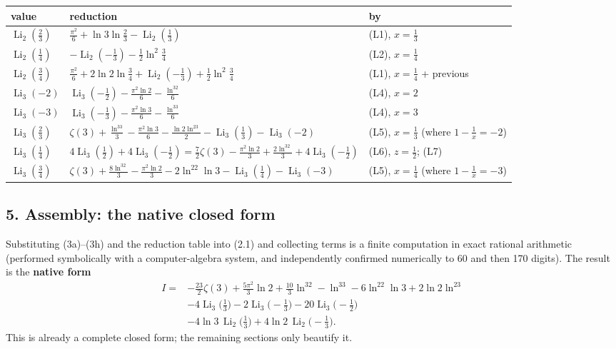 \documentclass[11pt]{article}
\theoremstyle{remark}
\begin{document}
\begin{center}
\footnotesize
\setlength{\tabcolsep}{5pt}
\renewcommand{\arraystretch}{1.6}
\begin{tabular}{lll}
\hline
value & reduction & by \\
\hline
$\operatorname{Li}_2(\frac23)$ & $\frac{\pi^2}{6}+\ln3\ln\frac23-\operatorname{Li}_2(\frac13)$ & (L1), $x=\frac13$ \\
$\operatorname{Li}_2(\frac14)$ & $-\operatorname{Li}_2(-\frac13)-\frac12\ln^2\frac34$ & (L2), $x=\frac14$ \\
$\operatorname{Li}_2(\frac34)$ & $\frac{\pi^2}{6}+2\ln2\ln\frac34+\operatorname{Li}_2(-\frac13)+\frac12\ln^2\frac34$ & (L1), $x=\frac14$ + previous \\
$\operatorname{Li}_3(-2)$ & $\operatorname{Li}_3(-\frac12)-\frac{\pi^2\ln2}{6}-\frac{\ln^32}{6}$ & (L4), $x=2$ \\
$\operatorname{Li}_3(-3)$ & $\operatorname{Li}_3(-\frac13)-\frac{\pi^2\ln3}{6}-\frac{\ln^33}{6}$ & (L4), $x=3$ \\
$\operatorname{Li}_3(\frac23)$ & $\zeta(3)+\frac{\ln^33}{3}-\frac{\pi^2\ln3}{6}-\frac{\ln2\ln^23}{2}-\operatorname{Li}_3(\frac13)-\operatorname{Li}_3(-2)$ & (L5), $x=\frac13$ (where $1-\frac1x=-2$) \\
$\operatorname{Li}_3(\frac14)$ & $4\operatorname{Li}_3(\frac12)+4\operatorname{Li}_3(-\frac12)=\frac72\zeta(3)-\frac{\pi^2\ln2}{3}+\frac{2\ln^32}{3}+4\operatorname{Li}_3(-\frac12)$ & (L6), $z=\frac12$; (L7) \\
$\operatorname{Li}_3(\frac34)$ & $\zeta(3)+\frac{8\ln^32}{3}-\frac{\pi^2\ln2}{3}-2\ln^22\ln3-\operatorname{Li}_3(\frac14)-\operatorname{Li}_3(-3)$ & (L5), $x=\frac14$ (where $1-\frac1x=-3$) \\
\hline
\end{tabular}
\end{center}

\subsection*{5. Assembly: the native closed form}

Substituting (3a)--(3h) and the reduction table into (2.1) and collecting terms is a finite computation in exact rational arithmetic (performed symbolically with a computer-algebra system, and independently confirmed numerically to 60 and then 170 digits). The result is the \textbf{native form}
\begin{equation*}
\begin{aligned}
I={}&-\frac{23}{2}\zeta(3)+\frac{5\pi^2}{3}\ln2+\frac{10}{3}\ln^32-\ln^33-6\ln^22\ln3+2\ln2\ln^23\\
&-4\operatorname{Li}_3\!\Big(\frac13\Big)-2\operatorname{Li}_3\!\Big(-\frac13\Big)-20\operatorname{Li}_3\!\Big(-\frac12\Big)\\
&-4\ln3\,\operatorname{Li}_2\!\Big(\frac13\Big)+4\ln2\,\operatorname{Li}_2\!\Big(-\frac13\Big).
\end{aligned}\tag{5.1}
\end{equation*}
This is already a complete closed form; the remaining sections only beautify it.
\end{document}
